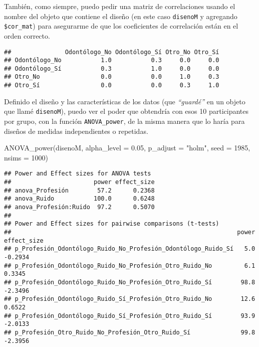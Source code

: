 \documentclass[
]{article}
\newenvironment{Shaded}{\begin{snugshade}}{\end{snugshade}}
\newcommand{\AttributeTok}[1]{\textcolor[rgb]{0.16,0.50,0.73}{#1}}
\newcommand{\DecValTok}[1]{\textcolor[rgb]{0.96,0.45,0.00}{#1}}
\newcommand{\FloatTok}[1]{\textcolor[rgb]{0.96,0.45,0.00}{#1}}
\newcommand{\FunctionTok}[1]{\textcolor[rgb]{0.56,0.27,0.68}{#1}}
\newcommand{\NormalTok}[1]{\textcolor[rgb]{0.81,0.81,0.76}{#1}}
\newcommand{\SpecialCharTok}[1]{\textcolor[rgb]{0.24,0.68,0.91}{#1}}
\newcommand{\StringTok}[1]{\textcolor[rgb]{0.96,0.31,0.31}{#1}}
\begin{document}
También, como siempre, puedo pedir una matriz de correlaciones usando el
nombre del objeto que contiene el diseño (en este caso \texttt{disenoM}
y agregando \texttt{\$cor\_mat}) para asegurarme de que los coeficientes
de correlación están en el orden correcto.

\begin{Shaded}
\end{Shaded}

\begin{verbatim}
##               Odontólogo_No Odontólogo_Sí Otro_No Otro_Sí
## Odontólogo_No           1.0           0.3     0.0     0.0
## Odontólogo_Sí           0.3           1.0     0.0     0.0
## Otro_No                 0.0           0.0     1.0     0.3
## Otro_Sí                 0.0           0.0     0.3     1.0
\end{verbatim}

Definido el diseño y las características de los datos (que
\emph{``guardé''} en un objeto que llamé \texttt{disenoM}), puedo ver el
poder que obtendría con esos 10 participantes por grupo, con la función
\texttt{ANOVA\_power}, de la misma manera que lo haría para diseños de
medidas independientes o repetidas.

\begin{Shaded}
\begin{Highlighting}[]
\FunctionTok{ANOVA\_power}\NormalTok{(disenoM,}
            \AttributeTok{alpha\_level =} \FloatTok{0.05}\NormalTok{,}
            \AttributeTok{p\_adjust =} \StringTok{"holm"}\NormalTok{,}
            \AttributeTok{seed =} \DecValTok{1985}\NormalTok{,}
            \AttributeTok{nsims =} \DecValTok{1000}\NormalTok{)}
\end{Highlighting}
\end{Shaded}

\begin{verbatim}
## Power and Effect sizes for ANOVA tests
##                       power effect_size
## anova_Profesión        57.2      0.2368
## anova_Ruido           100.0      0.6248
## anova_Profesión:Ruido  97.2      0.5070
## 
## Power and Effect sizes for pairwise comparisons (t-tests)
##                                                               power effect_size
## p_Profesión_Odontólogo_Ruido_No_Profesión_Odontólogo_Ruido_Sí   5.0     -0.2934
## p_Profesión_Odontólogo_Ruido_No_Profesión_Otro_Ruido_No         6.1      0.3345
## p_Profesión_Odontólogo_Ruido_No_Profesión_Otro_Ruido_Sí        98.8     -2.3496
## p_Profesión_Odontólogo_Ruido_Sí_Profesión_Otro_Ruido_No        12.6      0.6522
## p_Profesión_Odontólogo_Ruido_Sí_Profesión_Otro_Ruido_Sí        93.9     -2.0133
## p_Profesión_Otro_Ruido_No_Profesión_Otro_Ruido_Sí              99.8     -2.3956
\end{verbatim}
\end{document}
